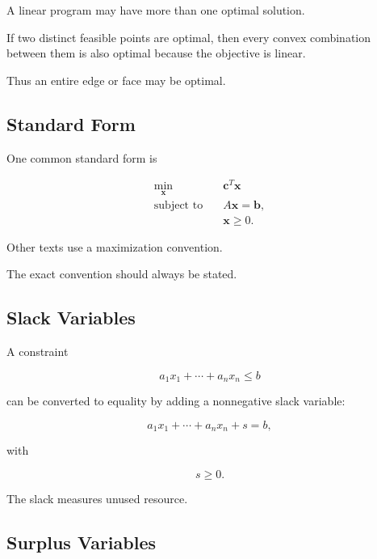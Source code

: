 A linear program may have more than one optimal solution.

If two distinct feasible points are optimal, then every convex
combination between them is also optimal because the objective is linear.

Thus an entire edge or face may be optimal.

\subsection{Standard Form}
\label{subsec:lp-standard-form}

One common standard form is

\[
\boxed{
\begin{aligned}
\min_{\mathbf{x}}
\quad&
\mathbf{c}^T\mathbf{x}
\\
\text{subject to}
\quad&
A\mathbf{x}
=
\mathbf{b},
\\
&
\mathbf{x}\geq0.
\end{aligned}
}
\]

Other texts use a maximization convention.

The exact convention should always be stated.

\subsection{Slack Variables}
\label{subsec:slack-variables}

A constraint

\[
a_1x_1+\cdots+a_nx_n\leq b
\]

can be converted to equality by adding a nonnegative slack variable:

\[
\boxed{
a_1x_1+\cdots+a_nx_n+s=b,
}
\]

with

\[
\boxed{
s\geq0.
}
\]

The slack measures unused resource.

\subsection{Surplus Variables}
\label{subsec:surplus-variables}


